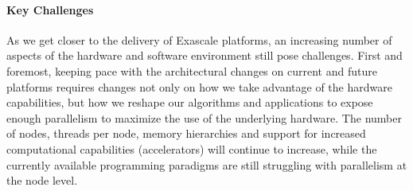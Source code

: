 \paragraph{Key Challenges}

As we get closer to the delivery of Exascale platforms, an increasing number of
aspects of the hardware and software environment still pose challenges. First
and foremost, keeping pace with the architectural changes on current and future
platforms requires changes not only on how we take advantage of the hardware
capabilities, but how we reshape our algorithms and applications to expose
enough parallelism to maximize the use of the underlying hardware. The number of
nodes, threads per node, memory hierarchies and support for increased
computational capabilities (accelerators) will continue to increase, while the
currently available programming paradigms are still struggling with parallelism
at the node level.

